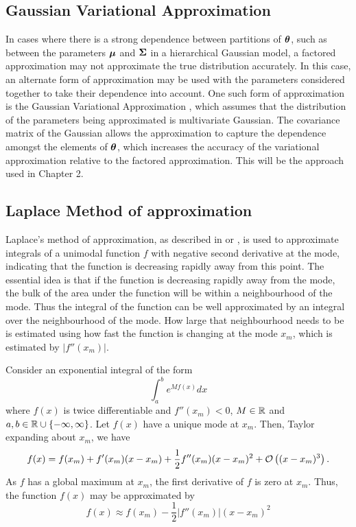 \subsection{Gaussian Variational Approximation}

In cases where there is a strong dependence between partitions of ${\boldsymbol \theta}$,  such as between the parameters
${\boldsymbol \mu}$ and ${\boldsymbol \Sigma}$ in a hierarchical Gaussian model, a factored approximation may not approximate the true
distribution accurately. In this case, an alternate form of approximation may be used with the parameters
considered together to take their dependence into account. One such form of approximation is the Gaussian
Variational Approximation \cite{Ormerod2012}, which assumes that the distribution of the parameters being
approximated is multivariate Gaussian. The covariance matrix of the Gaussian allows the approximation to
capture the dependence amongst the elements of ${\boldsymbol \theta}$, which increases the accuracy of the variational
approximation relative to the factored approximation. This will be the approach used in Chapter 2.

\subsection{Laplace Method of approximation}
\label{sec:laplace_approximation}
Laplace's method of approximation, as described in \cite{butler_2007} or \cite{MacKay:2002:ITI:971143}, is
used to approximate integrals of a unimodal function $f$ with negative second derivative at the mode,
indicating that the function is decreasing rapidly away from this point. The essential idea is that if the
function is decreasing rapidly away from the mode, the bulk of the area under the function will be within a
neighbourhood of the mode. Thus the integral of the function can be well approximated by an integral over the
neighbourhood of the mode. How large that neighbourhood needs to be is estimated using how fast the function
is changing at the mode $x_m$, which is estimated by $|f''(x_m)|$.

Consider an exponential integral of the form
$$
	\int_a^b e^{M f(x)} dx
$$
\noindent where $f(x)$ is twice differentiable and $f''(x_m) < 0$, $M \in {\mathbb{R}}$ and $a, b \in {\mathbb{R}} \cup \{-\infty,
\infty\}$. Let $f(x)$ have a unique mode at $x_m$. Then, Taylor expanding about $x_m$, we have
$$
	f(x) = f(x_m) + f'(x_m) (x - x_m) + \frac{1}{2} f''(x_m) (x - x_m)^2 + \mathcal{O}\left((x - x_m)^3\right).
$$
\noindent As $f$ has a global maximum at $x_m$, the first derivative of $f$ is zero at $x_m$. Thus, the
function $f(x)$ may be approximated by
$$
	f(x) \approx f(x_m) - \frac{1}{2} |f''(x_m)| (x - x_m)^2
$$

